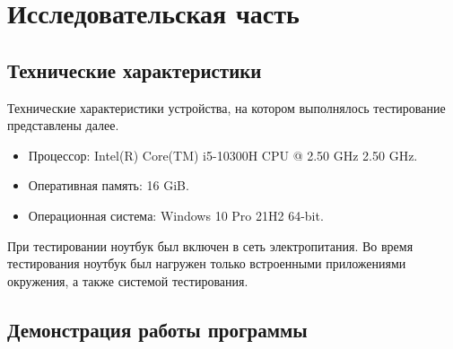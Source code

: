 \chapter{Исследовательская часть}

\section{Технические характеристики}

Технические характеристики устройства, на котором выполнялось тестирование представлены далее.

\begin{itemize}
	\item Процессор: Intel(R) Core(TM) i5-10300H CPU @ 2.50 GHz 2.50 GHz.
	\item Оперативная память: 16 GiB.
	\item Операционная система: Windows 10 Pro 21H2 64-bit.
\end{itemize}

При тестировании ноутбук был включен в сеть электропитания. Во время тестирования ноутбук был нагружен только встроенными приложениями
окружения, а также системой тестирования.

\section{Демонстрация работы программы}

